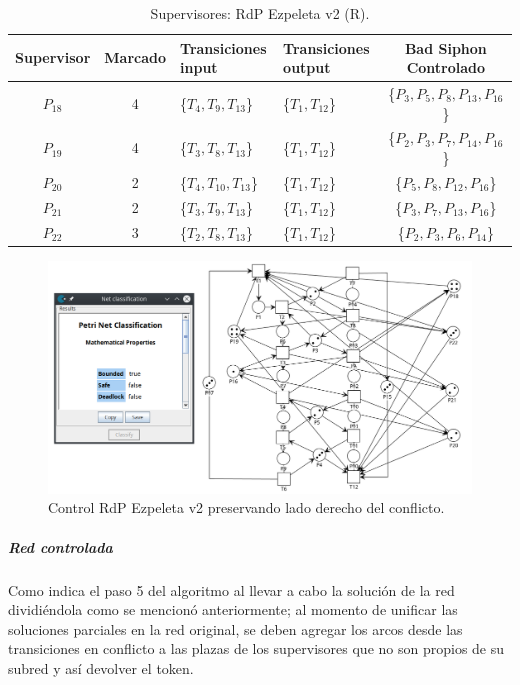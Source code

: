  \begin{table}[H]
    \centering
    \begin{tabular}{|c|c|P{2.2cm}|P{2.2cm}|c|}
    \hline
    \textbf{Supervisor} & \textbf{Marcado} & \textbf{Transiciones input} & \textbf{Transiciones output} & \textbf{Bad Siphon Controlado}  \\  \hline
    $P_{18}$ & 4 & \{$T_{4}, T_9, T_{13}$\} & \{$T_{1}, T_{12}$\} & \{$P_3, P_5, P_{8}, P_{13}, P_{16}$\} \\ 
    \hline
    $P_{19}$ & 4 & \{$T_{3}, T_8, T_{13}$\} & \{$T_{1}, T_{12}$\} & \{$P_{2},P_3, P_{7},P_{14}, P_{16}$\} \\ 
    \hline
    $P_{20}$ & 2 & \{$T_4, T_{10}, T_{13}$\} & \{$T_{1}, T_{12}$\} & \{$P_5, P_{8}, P_{12}, P_{16}$\} \\ 
    \hline
    $P_{21}$ & 2 & \{$T_3, T_{9}, T_{13}$\} & \{$T_{1}, T_{12}$\} & \{$P_{3},P_{7},P_{13},P_{16}$\} \\ 
    \hline
    $P_{22}$ & 3 & \{$T_2, T_{8}, T_{13}$\} & \{$T_{1}, T_{12}$\} & \{$P_{2},P_{3},P_{6},P_{14}$\} \\ 
    \hline
    \end{tabular}
    \caption{Supervisores: RdP Ezpeleta v2 (R).}
    \label{tab:Ezpeletav2-SubR-v3}
\end{table}
 
\begin{figure}[H]
	\centering
	\includegraphics[scale=0.48]{Figures/algoritmo3/ezpeletav26.png}
	\caption{Control RdP Ezpeleta v2 preservando lado derecho del conflicto.}
	\label{fig:control_conflictoider_ezpeletav2}
 \end{figure}

\subparagraph{Red controlada}
\hfil \break
Como indica el paso 5 del algoritmo al llevar a cabo la solución de la red dividiéndola como se mencionó anteriormente; al momento de unificar las soluciones parciales en la red original, se deben agregar los arcos desde las transiciones en conflicto a las plazas de los supervisores que no son propios de su subred y así  devolver el token.\\

